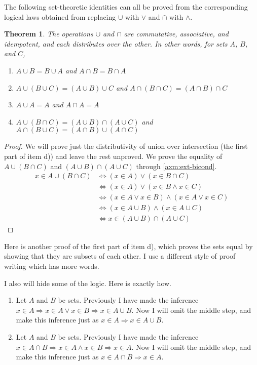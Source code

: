 \documentclass[12pt]{article}
\newcounter{thmc}
\newtheorem{thm}[thmc]{Theorem}
\begin{document}
The following set-theoretic identities can all be proved from the
corresponding logical laws obtained from replacing $\cup$ with $\vee$
and $\cap$ with $\wedge$.

\begin{thm}\label{thm:op}
  The operations $\cup$ and $\cap$ are commutative, associative, and
  idempotent, and each distributes over the other.  In other words,
  for sets $A$, $B$, and $C$,
  \begin{enumerate}[label=\alph*)]
  \item $A\cup B=B\cup A$ and $A\cap B=B\cap A$
  \item $A\cup (B\cup C)=(A\cup B)\cup C$ and $A\cap (B\cap C)=(A\cap B)\cap C$
  \item $A\cup A=A$ and $A\cap A=A$
  \item $A\cup(B\cap C)=(A\cup B)\cap(A\cup C)$ and $A\cap(B\cup C)=(A\cap
    B)\cup(A\cap C)$
  \end{enumerate}
\end{thm}

\begin{proof}
  We will prove just the distributivity of union over intersection
  (the first part of item d)) and leave the rest unproved.  We prove
  the equality of $A\cup(B\cap C)$ and $(A\cup B)\cap(A\cup C)$
  through \ref{axm:ext-bicond}.
  \begin{align*}
    x\in A\cup(B\cap C)
    &\Leftrightarrow (x\in A)\vee(x\in B\cap C) \\
    &\Leftrightarrow (x\in A)\vee(x\in B\wedge x\in C) \\
    &\Leftrightarrow (x\in A\vee x\in B)\wedge (x\in A\vee x\in C)\\
    &\Leftrightarrow (x\in A\cup B)\wedge (x\in A\cup C)\\
    &\Leftrightarrow x\in (A\cup B)\cap(A\cup C)
  \end{align*}
\end{proof}

Here is another proof of the first part of item d), which proves the
sets equal by showing that they are subsets of each other.  I use a
different style of proof writing which has more words.

I also will hide some of the logic.  Here is exactly how.

\begin{enumerate}
  \item Let $A$ and $B$ be sets.  Previously I have made the inference
    $x\in A\Rightarrow x\in A \vee x\in B \Rightarrow x\in A\cup B$.
    Now I will omit the middle step, and make this inference just as
    $x\in A \Rightarrow x\in A\cup B$.
  \item Let $A$ and $B$ be sets.  Previously I have made the inference
    $x\in A\cap B\Rightarrow x\in A \wedge x\in B \Rightarrow x\in A$.
    Now I will omit the middle step, and make this inference just as
    $x\in A\cap B \Rightarrow x\in A$.
\end{enumerate}
\end{document}
